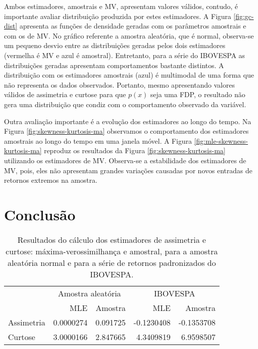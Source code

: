 \documentclass[]{article}
\begin{document}
Ambos estimadores, amostrais e MV, apresentam valores válidos, contudo,
é importante avaliar distribuição produzida por estes estimadores. A
Figura \ref{fig:gc-dist} apresenta as funções de densidade geradas com
os parâmetros amostrais e com os de MV. No gráfico referente a amostra
aleatória, que é normal, observa-se um pequeno desvio entre as
distribuições geradas pelos dois estimadores (vermelha é MV e azul é
amostral). Entretanto, para a série do IBOVESPA as distribuições geradas
apresentam comportamentos bastante distintos. A distribuição com os
estimadores amostrais (azul) é multimodal de uma forma que não
representa os dados observados. Portanto, mesmo apresentando valores
válidos de assimetria e curtose para que \(p(x)\) seja uma FDP, o
resultado não gera uma distribuição que condiz com o comportamento
observado da variável.

Outra avaliação importante é a evolução dos estimadores ao longo do
tempo. Na Figura \ref{fig:skewness-kurtosis-ma} observamos o
comportamento dos estimadores amostrais ao longo do tempo em uma janela
móvel. A Figura \ref{fig:mle-skewness-kurtosis-ma} reproduz os
resultados da Figura \ref{fig:skewness-kurtosis-ma} utilizando os
estimadores de MV. Observa-se a estabilidade dos estimadores de MV,
pois, eles não apresentam grandes variações causadas por novos entradas
de retornos extremos na amostra.

\section{Conclusão}\label{conclusao}

\begin{table}

\caption{\label{tab:unnamed-chunk-14}\label{tab:mv-results} Resultados do cálculo dos estimadores de assimetria e curtose: máxima-verossimilhança e amostral, para a amostra aleatória normal e para a série de retornos padronizados do IBOVESPA.}
\centering
\begin{tabular}[t]{lrrrr}
\toprule
\multicolumn{1}{c}{ } & \multicolumn{2}{c}{Amostra aleatória} & \multicolumn{2}{c}{IBOVESPA} \\
\cmidrule(l{2pt}r{2pt}){2-3} \cmidrule(l{2pt}r{2pt}){4-5}
  & MLE & Amostra & MLE & Amostra\\
\midrule
Assimetria & 0.0000274 & 0.091725 & -0.1230408 & -0.1353708\\
Curtose & 3.0000166 & 2.847665 & 4.3409819 & 6.9598507\\
\bottomrule
\end{tabular}
\end{table}
\end{document}
